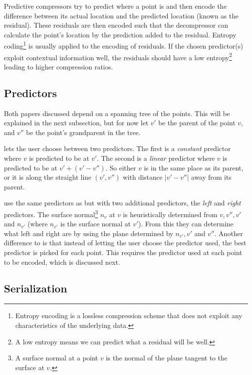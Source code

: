 \documentclass{report}
\begin{document}
Predictive compressors try to predict where a point is and then encode the
difference between its actual location and the predicted location (known as
the residual). These residuals are then encoded such that the decompressor can
calculate the point's location by the prediction added to the
residual. Entropy coding\footnote{Entropy encoding is a lossless compression
  scheme that does not exploit any characteristics of the underlying data.} is
usually applied to the encoding of residuals. If the chosen predictor(s)
exploit contextual information well, the residuals should have a low
entropy\footnote{A low entropy means we can predict what a residual will be
  well.}  leading to higher compression ratios.


\subsection{Predictors}

Both papers discussed depend on a spanning tree of the points. This will be
explained in the next subsection, but for now let $v'$ be the parent of the
point $v$, and $v''$ be the point's grandparent in the tree.

\citet{gumholdcomp} lets the user choose between two predictors. The first is
a \emph{constant} predictor where $v$ is predicted to be at $v'$. The second
is a \emph{linear} predictor where $v$ is predicted to be at $v' + (v' -
v'')$. So either $v$ is in the same place as its parent, or it is along the
straight line $(v', v'')$ with distance $|v'-v''|$ away from its parent.

\citet{merrycomp} use the same predictors as \citeauthor{gumholdcomp} but with
two additional predictors, the \emph{left} and \emph{right} predictors. The
surface normal\footnote{A surface normal at a point $v$ is the normal of the
  plane tangent to the surface at $v$.} $n_v$ at $v$ is heuristically
determined from $v, v'', v'$ and $n_{v'}$ (where $n_{v'}$ is the surface
normal at $v'$). From this they can determine what left and right are by using
the plane determined by $n_{v'}, v'$ and $v''$. Another difference to
\citeauthor{gumholdcomp} is that instead of letting the user choose the
predictor used, the best predictor is picked for each point. This requires the
predictor used at each point to be encoded, which is discussed next.


\subsection{Serialization}
\end{document}
